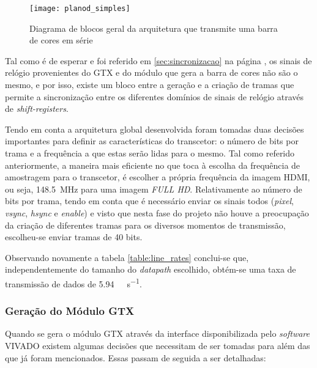 \begin{figure}[h!]
	\begin{center}
		\leavevmode
		\texttt{[image: planod\_simples]}
		\captionsetup{width=1.0\linewidth}
		\caption[Diagrama de blocos geral da arquitetura que transmite uma barra de cores em série]{Diagrama de blocos geral da arquitetura que transmite uma barra de cores em série}
		\label{fig:planD_SIMPLES}
	\end{center}
\end{figure}

Tal como é de esperar e foi referido em \ref{sec:sincronizacao} na página \pageref{sec:sincronizacao}, os sinais de relógio provenientes do GTX e do módulo que gera a barra de cores não são o mesmo, e por isso, existe um bloco entre a geração e a criação de tramas que permite a sincronização entre os diferentes domínios de sinais de relógio através de \textit{shift-registers}.

Tendo em conta a arquitetura global desenvolvida foram tomadas duas decisões importantes para definir as características do transcetor: o número de bits por trama e a frequência a que estas serão lidas para o mesmo. Tal como referido anteriormente, a maneira mais eficiente no que toca à escolha da frequência de amostragem para o transcetor, é escolher a própria frequência da imagem HDMI, ou seja, \SI{148.5}{\mega\hertz} para uma imagem \textit{FULL HD}. Relativamente ao número de bits por trama, tendo em conta que é necessário enviar os sinais todos (\textit{pixel}, \textit{vsync}, \textit{hsync} e \textit{enable}) e visto que nesta fase do projeto não houve a preocupação da criação de diferentes tramas para os diversos momentos de transmissão, escolheu-se enviar tramas de 40 bits.

Observando novamente a tabela \ref{table:line_rates} conclui-se que, independentemente do tamanho do \textit{datapath} escolhido, obtém-se uma taxa de transmissão de dados de \SI{5.94}{\giga\bit\per\second}.

\subsubsection{Geração do Módulo GTX} \label{subsub:GTX_generate}

Quando se gera o módulo GTX através da interface disponibilizada pelo \textit{software} VIVADO existem algumas decisões que necessitam de ser tomadas para além das que já foram mencionados. Essas passam de seguida a ser detalhadas:

